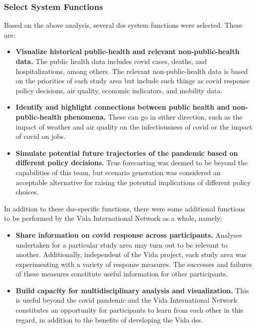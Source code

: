 \begin{landscape}
\begin{longtable}{| C{2cm} |  L{5.33cm} | L{5.33cm} | L{5.33cm} |}
\end{longtable}

\end{landscape}


\subsubsection{Select System Functions}

Based on the above analysis, several \ac{dss} system functions were selected. These are:

\begin{itemize}[itemsep=0pt,parsep=0pt]
	\item{\textbf{Visualize historical public-health and relevant non-public-health data.} The public health data includes \ac{covid} cases, deaths, and hospitalizations, among others. The relevant non-public-health data is based on the priorities of each study area but include such things as \ac{covid} response policy decisions, air quality, economic indicators, and mobility data.}
	\item{\textbf{Identify and highlight connections between public health and non-public-health phenomena.} These can go in either direction, such as the impact of weather and air quality on the infectiousness of \ac{covid} or the impact of \ac{covid} on jobs.}
	\item{\textbf{Simulate potential future trajectories of the pandemic based on different policy decisions.} True forecasting was deemed to be beyond the capabilities of this team, but scenario generation was considered an acceptable alternative for raising the potential implications of different policy choices.} 
\end{itemize}

In addition to these \ac{dss}-specific functions, there were some additional functions to be performed by the Vida International Network as a whole, namely:

\begin{itemize}[itemsep=0pt,parsep=0pt]
	\item{\textbf{Share information on \ac{covid} response across participants.} Analyses undertaken for a particular study area may turn out to be relevant to another. Additionally, independent of the Vida project, each study area was experimenting with a variety of response measures. The successes and failures of these measures constitute useful information for other participants.}
	\item{\textbf{Build capacity for multidisciplinary analysis and visualization.} This is useful beyond the \ac{covid} pandemic and the Vida International Network constitutes an opportunity for participants to learn from each other in this regard, in addition to the benefits of developing the Vida \ac{dss}.}
\end{itemize}

